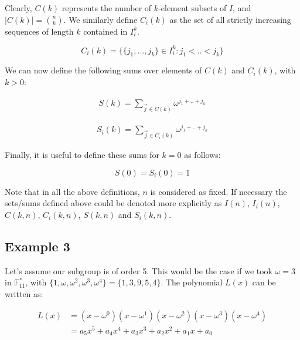 \documentclass[a4paper]{article}
\begin{document}
Clearly, $C(k)$ represents the number of $k$-element subsets of $I$, and $|C(k)| = \binom{n}{k}$. We similarly  define $C_i(k)$ as the set of all strictly increasing sequences of length $k$ contained in $I_i^k$.

\begin{equation}
  C_i(k) = \{ \{j_1, ..., j_k\} \in I_i^k : j_1 < .. < j_k \}
\end{equation}

We can now define the following sums over elements of $C(k)$ and $C_i(k)$, with $k > 0$:

\begin{equation}
  \begin{aligned}
    S(k) = \sum_{\vec{j} \in C(k)} \omega^{j_1 + .. + j_k}
  \end{aligned}
\end{equation}

\begin{equation}
  \begin{aligned}
    S_i(k) = \sum_{\vec{j} \in C_i(k)} \omega^{j_1 + .. + j_k}
  \end{aligned}
\end{equation}

Finally, it is useful to define these sums for $k=0$ as follows:

\begin{equation}
    S(0) = S_i(0) = 1
\end{equation}

Note that in all the above definitions, $n$ is considered as fixed. If necessary the sets/sums defined above could be denoted more explicitly as $I(n)$, $I_i(n)$, $C(k,n)$, $C_i(k,n)$, $S(k,n)$ and $S_i(k,n)$.



\subsection{Example 3}

Let's assume our subgroup is of order 5. This would be the case if we took $\omega = 3$ in $\mathbb{F}_{11}^{*}$, with $\{ 1, \omega, \omega^2, \omega^3, \omega^4 \} = \{1, 3, 9, 5, 4\}$. The polynomial $L(x)$ can be written as:

\begin{equation}
  \begin{aligned}
    L(x) &= (x - \omega^0)(x - \omega^1)(x - \omega^2)(x - \omega^3)(x - \omega^4) \\
         &= a_5 x^5 + a_4 x^4 + a_3 x^3 + a_2 x^2 + a_1 x + a_0
  \end{aligned}
\end{equation}
\end{document}
